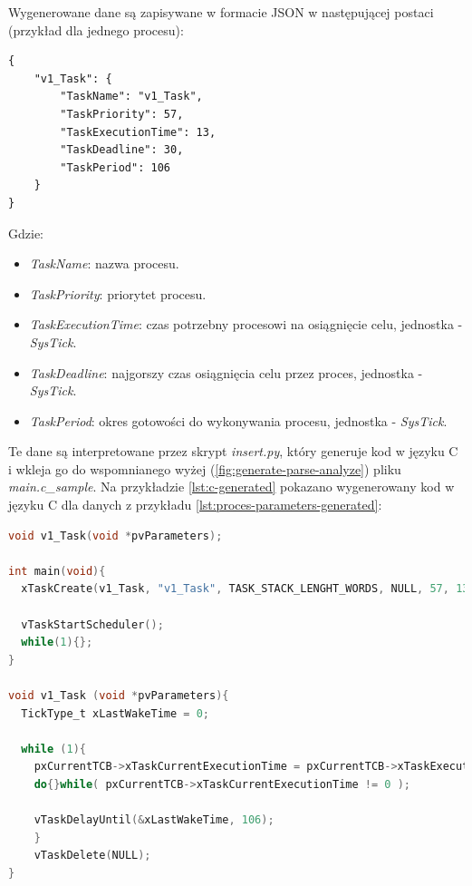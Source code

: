\documentclass[../../main]{subfiles}
\begin{document}
Wygenerowane dane są zapisywane w formacie JSON w następującej postaci (przykład dla jednego procesu):

\begin{lstlisting}[caption={Wygenerowane parametry procesu}, label={lst:proces-parameters-generated}]
{
    "v1_Task": {
        "TaskName": "v1_Task",
        "TaskPriority": 57,
        "TaskExecutionTime": 13,
        "TaskDeadline": 30,
        "TaskPeriod": 106
    }
}
\end{lstlisting}

Gdzie:

\begin{itemize}
    \item \textit{TaskName}: nazwa procesu.
    \item \textit{TaskPriority}: priorytet procesu.
    \item \textit{TaskExecutionTime}: czas potrzebny procesowi na osiągnięcie celu, jednostka - \textit{SysTick}.
    \item \textit{TaskDeadline}: najgorszy czas osiągnięcia celu przez proces, jednostka - \textit{SysTick}.
    \item \textit{TaskPeriod}: okres gotowości do wykonywania procesu, jednostka - \textit{SysTick}.
\end{itemize}

Te dane są interpretowane przez skrypt \textit{insert.py}, który generuje kod w języku C i wkleja go do wspomnianego wyżej (\cref{fig:generate-parse-analyze}) pliku \textit{main.c\_sample}. Na przykładzie \ref{lst:c-generated} pokazano wygenerowany kod w języku C dla danych z przykładu \ref{lst:proces-parameters-generated}:

\begin{lstlisting}[language=C, caption={Wygenerowany kod w języku C}, label={lst:c-generated}]
void v1_Task(void *pvParameters);

int main(void){
  xTaskCreate(v1_Task, "v1_Task", TASK_STACK_LENGHT_WORDS, NULL, 57, 13, 30, NULL);

  vTaskStartScheduler();
  while(1){};
}

void v1_Task (void *pvParameters){
  TickType_t xLastWakeTime = 0;

  while (1){
    pxCurrentTCB->xTaskCurrentExecutionTime = pxCurrentTCB->xTaskExecutionTime;
    do{}while( pxCurrentTCB->xTaskCurrentExecutionTime != 0 );

    vTaskDelayUntil(&xLastWakeTime, 106);
    }
    vTaskDelete(NULL);
}
\end{lstlisting}
\end{document}
